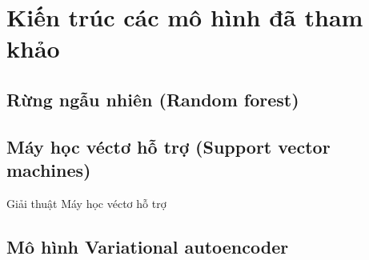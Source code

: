\section{Kiến trúc các mô hình đã tham khảo}

\subsection{Rừng ngẫu nhiên (Random forest)}

\subsection{Máy học véctơ hỗ trợ (Support vector machines)}
Giải thuật Máy học véctơ hỗ trợ 

\subsection{Mô hình Variational autoencoder}